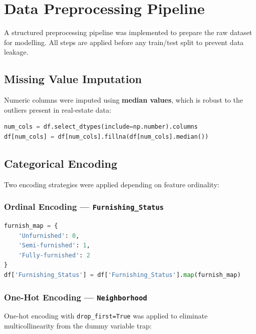 \documentclass[12pt,a4paper]{article}
\begin{document}
\section{Data Preprocessing Pipeline}

A structured preprocessing pipeline was implemented to prepare the raw dataset for
modelling. All steps are applied before any train/test split to prevent data leakage.

\subsection{Missing Value Imputation}

Numeric columns were imputed using \textbf{median values}, which is robust to the outliers
present in real-estate data:

\begin{lstlisting}[language=Python, caption={Median Imputation}]
num_cols = df.select_dtypes(include=np.number).columns
df[num_cols] = df[num_cols].fillna(df[num_cols].median())
\end{lstlisting}

\subsection{Categorical Encoding}

Two encoding strategies were applied depending on feature ordinality:

\subsubsection*{Ordinal Encoding --- \texttt{Furnishing\_Status}}

\begin{lstlisting}[language=Python, caption={Ordinal Encoding}]
furnish_map = {
    'Unfurnished': 0,
    'Semi-furnished': 1,
    'Fully-furnished': 2
}
df['Furnishing_Status'] = df['Furnishing_Status'].map(furnish_map)
\end{lstlisting}

\subsubsection*{One-Hot Encoding --- \texttt{Neighborhood}}

One-hot encoding with \texttt{drop\_first=True} was applied to eliminate multicollinearity
from the dummy variable trap:
\end{document}
